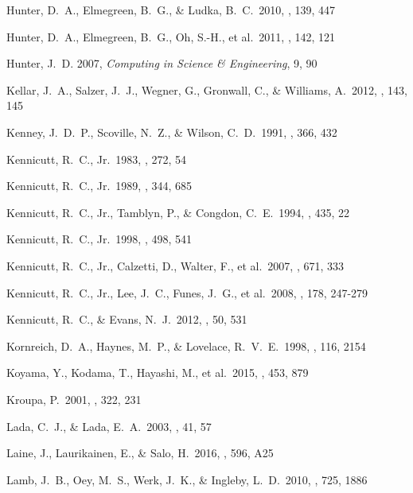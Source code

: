  Hunter, D.~A., Elmegreen, B.~G., \& Ludka, B.~C.\ 2010, \aj, 139, 447 

 Hunter, D.~A., Elmegreen, B.~G., Oh, S.-H., et al.\ 2011, \aj, 142, 121 

 Hunter, J.~D. 2007, \emph{Computing in Science \& Engineering}, 9, 90


 Kellar, J.~A., Salzer, J.~J., Wegner, G., Gronwall, C., \& Williams, A.\ 2012, \aj, 143, 145 

 Kenney, J.~D.~P., Scoville, N.~Z., \& Wilson, C.~D.\ 1991, \apj, 366, 432 

 Kennicutt, R.~C., Jr.\ 1983, \apj, 272, 54 

 Kennicutt, R.~C., Jr.\ 1989, \apj, 344, 685 

 Kennicutt, R.~C., Jr., Tamblyn, P., \& Congdon, C.~E.\ 1994, \apj, 435, 22 

 Kennicutt, R.~C., Jr.\ 1998, \apj, 498, 541 

 Kennicutt, R.~C., Jr., Calzetti, D., Walter, F., et al.\ 2007, \apj, 671, 333 


 Kennicutt, R.~C., Jr., Lee, J.~C., Funes, J.~G., et al.\ 2008, \apjs, 178, 247-279 

 Kennicutt, R.~C., \& Evans, N.~J.\ 2012, \araa, 50, 531 


 Kornreich, D.~A., Haynes, M.~P., \& Lovelace, R.~V.~E.\ 1998, \aj, 116, 2154 

 Koyama, Y., Kodama, T., Hayashi, M., et al.\ 2015, \mnras, 453, 879 


 Kroupa, P.\ 2001, \mnras, 322, 231 

 Lada, C.~J., \& Lada, E.~A.\ 2003, \araa, 41, 57 

 Laine, J., Laurikainen, E., \& Salo, H.\ 2016, \aap, 596, A25 

 Lamb, J.~B., Oey, M.~S., Werk, J.~K., \& Ingleby, L.~D.\ 2010, \apj, 725, 1886 

